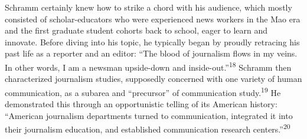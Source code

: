 \documentclass{tufte-handout}
\begin{document}
\begin{CJK*}{UTF8}{gbsn}
Schramm certainly knew how to strike a chord with his audience, which
mostly consisted of scholar-educators who were experienced news workers
in the Mao era and the first graduate student cohorts back to school,
eager to learn and innovate. Before diving into his topic, he typically
began by proudly retracing his past life as a reporter and an editor:
``The blood of journalism flows in my veins. In other words, I am a
newsman upside-down and inside-out.''\textsuperscript{18} Schramm
then characterized journalism studies, supposedly concerned with one
variety of human communication, as a subarea and ``precursor'' of
communication study.\textsuperscript{19} He demonstrated this through an
opportunistic telling of its American history: ``American journalism
departments turned to communication, integrated it into their journalism
education, and established communication research centers.''\textsuperscript{20}
  
\newpage


\end{CJK*}
\end{document}
